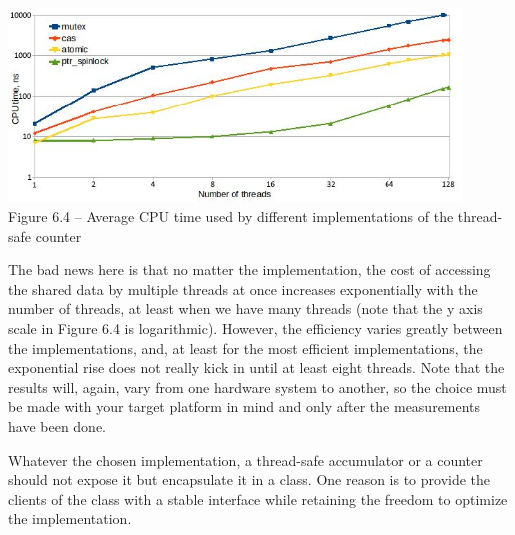 \hspace*{\fill} \\ %
\begin{center}
\includegraphics[width=0.9\textwidth]{content/2/chapter6/images/4.jpg}\\
Figure 6.4 – Average CPU time used by different implementations of the thread-safe counter
\end{center}

The bad news here is that no matter the implementation, the cost of accessing the shared data by multiple threads at once increases exponentially with the number of threads, at least when we have many threads (note that the y axis scale in Figure 6.4 is logarithmic). However, the efficiency varies greatly between the implementations, and, at least for the most efficient implementations, the exponential rise does not really kick in until at least eight threads. Note that the results will, again, vary from one hardware system to another, so the choice must be made with your target platform in mind and only after the measurements have been done.

Whatever the chosen implementation, a thread-safe accumulator or a counter should not expose it but encapsulate it in a class. One reason is to provide the clients of the class with a stable interface while retaining the freedom to optimize the implementation.

